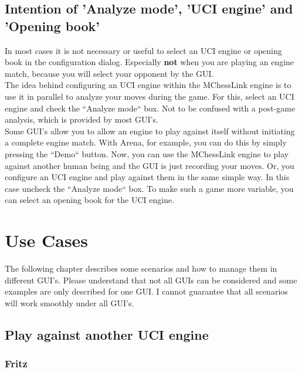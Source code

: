\documentclass[11pt,a4paper]{article}
\begin{document}
\subsection{Intention of 'Analyze mode', 'UCI engine' and 'Opening book'}
In most cases it is not necessary or useful to select an UCI engine or opening book in the configuration dialog. Especially \textbf{not} when you are playing an engine match, because you will select your opponent by the GUI.\\The idea behind configuring an UCI engine within the MChessLink engine is to use it in parallel to analyze your moves during the game. For this, select an UCI engine and check the ``Analyze mode`` box. Not to be confused with a post-game analysis, which is provided by most GUI's.\\
Some GUI's allow you to allow an engine to play against itself without initiating a complete engine match. With Arena, for example, you can do this by simply pressing the ``Demo`` button. Now, you can use the MChessLink engine to play against another human being and the GUI is just recording your moves. Or, you configure an UCI engine and play against them in the same simple way. In this case uncheck the ``Analyze mode`` box. To make such a game more variable, you can select an opening book for the UCI engine.\\

\newpage
\section{Use Cases}
The following chapter describes some scenarios and how to manage them in different GUI’s. Please understand that not all GUIs can be considered and some examples are only described for one GUI. I cannot guarantee that all scenarios will work smoothly under all GUI's.
\subsection{Play against another UCI engine}
\subsubsection{Fritz}
\end{document}
